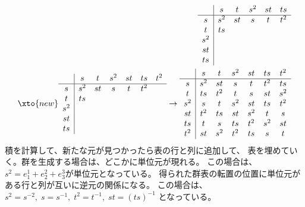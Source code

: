\begin{example}[三次対称群の生成]
\begin{equation*}
\begin{split}
\begin{array}{c|ccccc}
			& s & t & s^2 & st & ts \\ \hline
			s & s^2 & st & s & t & t^2 \\
			t & ts \\
			s^2 \\
			st \\
			ts \\
			\end{array} \\
			\xto{new} \begin{array}{c|cccccc}
			& s & t & s^2 & st & ts & t^2 \\ \hline
			s & s^2 & st & s & t & t^2 \\
			t & ts \\
			s^2 \\
			st \\
			ts \\
			\end{array} \to \begin{array}{c|cccccc}
			& s & t & s^2 & st & ts & t^2\\ \hline
			s & s^2 & st & s & t & t^2 & ts \\
			t & ts & t^2 & t & s & st & s^2 \\
			s^2 & s & t & s^2 & st & ts & t^2 \\
			st & t^2 & ts & st & s^2 & t & s \\
			ts & t & s & ts & t^2 & s^2 & st \\
			t^2 & st & s^2 & t^2 & ts & s & t \\
			\end{array}
		\end{split}\end{equation*}
		積を計算して、新たな元が見つかったら表の行と列に追加して、
		表を埋めていく。群を生成する場合は、どこかに単位元が現れる。
		この場合は、$s^2=e_1^1+e_2^2+e_3^3$が単位元となっている。
		得られた群表の転置の位置に単位元がある行と列が互いに逆元の関係になる。
		この場合は、$s^2=s^{-2},\;s=s^{-1},\;t^2=t^{-1},\;st=(ts)^{-1}$
		となっている。
	\end{example} %

\endgroup %
